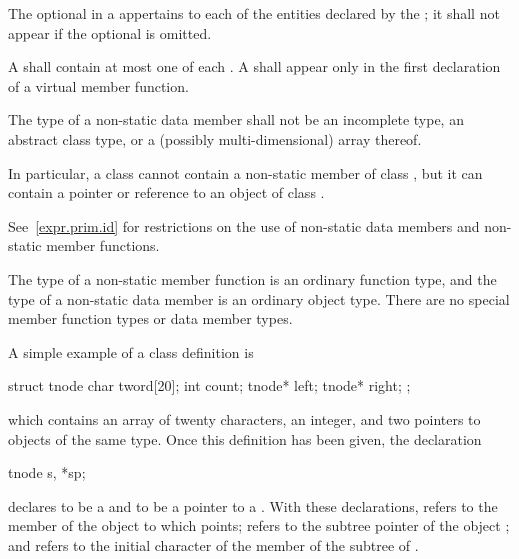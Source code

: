 \pnum
The optional  in a 
appertains to each of the entities declared by the ;
it shall not appear if the optional  is omitted.

\pnum
A  shall contain at most one of each
.
A 
shall appear only in the first declaration of a virtual member
function.

\pnum
{}%
The type of a non-static data member shall not be an
incomplete type,
an abstract class type,
or a (possibly multi-dimensional) array thereof.
\begin{note}
In particular, a class  cannot contain
a non-static member of class ,
but it can contain a pointer or reference to an object of class .
\end{note}

\pnum
\begin{note}
See~\ref{expr.prim.id} for restrictions on the use of non-static data
members and non-static member functions.
\end{note}

\pnum
\begin{note}
The type of a non-static member function is an ordinary function type,
and the type of a non-static data member is an ordinary object type.
There are no special member function types or data member types.
\end{note}

\pnum
\begin{example}
A simple example of a class definition is
\begin{codeblock}
struct tnode {
  char tword[20];
  int count;
  tnode* left;
  tnode* right;
};
\end{codeblock}
which contains an array of twenty characters, an integer, and two
pointers to objects of the same type. Once this definition has been
given, the declaration
\begin{codeblock}
tnode s, *sp;
\end{codeblock}
declares  to be a  and  to be a pointer
to a . With these declarations,  refers to
the  member of the object to which  points;
 refers to the  subtree pointer of the object
; and  refers to the initial character
of the  member of the  subtree of .
\end{example}

